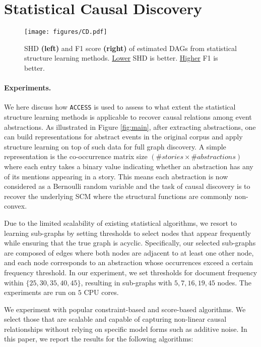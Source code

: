 \section{Statistical Causal Discovery}\label{sup:causal_discovery}



\begin{figure*}[hbt!]
    \centering
    \texttt{[image: figures/CD.pdf]}
    \caption{SHD \textbf{(left)} and F1 score \textbf{(right)} of estimated DAGs from statistical structure learning methods. \underline{Lower} SHD is better. \underline{Higher} F1 is better.}
    \label{fig:ssl}
\end{figure*}


\paragraph{Experiments.} We here discuss how \texttt{ACCESS} is used to assess to what extent the statistical structure learning methods is applicable to recover causal relations among event abstractions. As illustrated in Figure \ref{fig:main}, after extracting abstractions, one can build representations for abstract events in the original corpus and apply structure learning on top of such data for full graph discovery. A simple representation is the co-occurrence matrix size $(\# stories \times \# abstractions)$ where each entry takes a binary value indicating whether an abstraction has any of its mentions appearing in a story. This means each abstraction is now considered as a Bernoulli random variable and the task of causal discovery is to recover the underlying SCM where the structural functions are commonly non-convex. 

Due to the limited scalability of existing statistical algorithms, we resort to learning sub-graphs by setting thresholds to select nodes that appear frequently while ensuring that the true graph is acyclic. Specifically, our selected sub-graphs are composed of edges where both nodes are adjacent to at least one other node, and each node corresponds to an abstraction whose occurrences exceed a certain frequency threshold. In our experiment, we set thresholds for document frequency within  $\{25, 30, 35, 40, 45\}$, resulting in sub-graphs with $5, 7, 16, 19, 45$ nodes. The experiments are run on $5$ CPU cores.    


We experiment with popular constraint-based and score-based algorithms. We select those that are scalable and capable of capturing non-linear causal relationships without relying on specific model forms such as additive noise. In this paper, we report the results for the following algorithms: 


